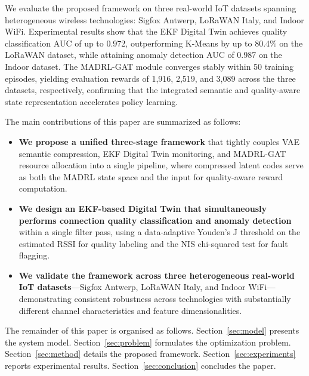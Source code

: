 We evaluate the proposed framework on three real-world IoT datasets spanning
heterogeneous wireless technologies: Sigfox Antwerp, LoRaWAN Italy, and
Indoor WiFi. Experimental results show that the EKF Digital Twin achieves
quality classification AUC of up to 0.972, outperforming K-Means by up to
80.4\% on the LoRaWAN dataset, while attaining anomaly detection AUC of
0.987 on the Indoor dataset. The MADRL-GAT module converges stably within
50 training episodes, yielding evaluation rewards of 1,916, 2,519, and 3,089
across the three datasets, respectively, confirming that the integrated
semantic and quality-aware state representation accelerates policy learning.

The main contributions of this paper are summarized as follows:
\begin{itemize}
\item \textbf{We propose a unified three-stage framework} that tightly couples
VAE semantic compression, EKF Digital Twin monitoring, and MADRL-GAT resource
allocation into a single pipeline, where compressed latent codes serve as both
the MADRL state space and the input for quality-aware reward computation.
\item \textbf{We design an EKF-based Digital Twin that simultaneously performs
connection quality classification and anomaly detection} within a single filter
pass, using a data-adaptive Youden's J threshold on the estimated RSSI for
quality labeling and the NIS chi-squared test for fault flagging.
\item \textbf{We validate the framework across three heterogeneous real-world
IoT datasets}---Sigfox Antwerp, LoRaWAN Italy, and Indoor WiFi---demonstrating
consistent robustness across technologies with substantially different channel
characteristics and feature dimensionalities.
\end{itemize}

The remainder of this paper is organised as follows. Section~\ref{sec:model}
presents the system model. Section~\ref{sec:problem} formulates the
optimization problem. Section~\ref{sec:method} details the proposed framework.
Section~\ref{sec:experiments} reports experimental results.
Section~\ref{sec:conclusion} concludes the paper.
